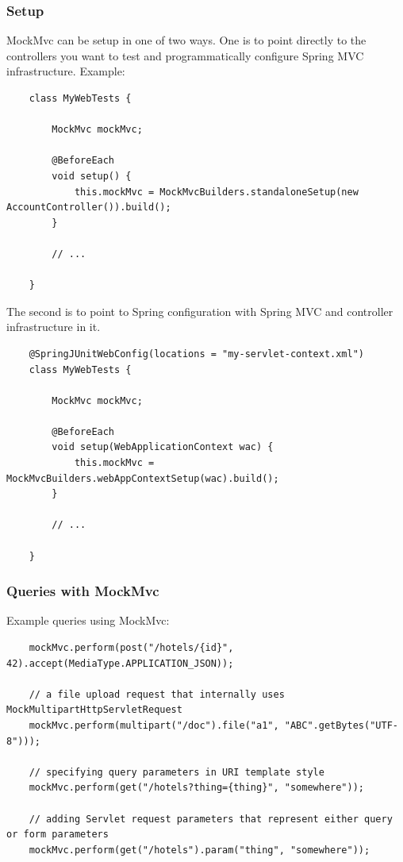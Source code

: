 \documentclass{scrartcl}
\begin{document}
\subsubsection{Setup}

MockMvc can be setup in one of two ways. One is to point directly to the controllers you want to test and programmatically configure Spring MVC infrastructure. Example:

\begin{lstlisting}
    class MyWebTests {

        MockMvc mockMvc;

        @BeforeEach
        void setup() {
            this.mockMvc = MockMvcBuilders.standaloneSetup(new AccountController()).build();
        }

        // ...

    }
\end{lstlisting}

The second is to point to Spring configuration with Spring MVC and controller infrastructure in it.

\begin{lstlisting}
    @SpringJUnitWebConfig(locations = "my-servlet-context.xml")
    class MyWebTests {

        MockMvc mockMvc;

        @BeforeEach
        void setup(WebApplicationContext wac) {
            this.mockMvc = MockMvcBuilders.webAppContextSetup(wac).build();
        }

        // ...

    }
\end{lstlisting}

\subsubsection{Queries with MockMvc}

Example queries using MockMvc:

\begin{lstlisting}
    mockMvc.perform(post("/hotels/{id}", 42).accept(MediaType.APPLICATION_JSON));

    // a file upload request that internally uses MockMultipartHttpServletRequest
    mockMvc.perform(multipart("/doc").file("a1", "ABC".getBytes("UTF-8")));

    // specifying query parameters in URI template style
    mockMvc.perform(get("/hotels?thing={thing}", "somewhere"));

    // adding Servlet request parameters that represent either query or form parameters
    mockMvc.perform(get("/hotels").param("thing", "somewhere"));


\end{lstlisting}
\end{document}
